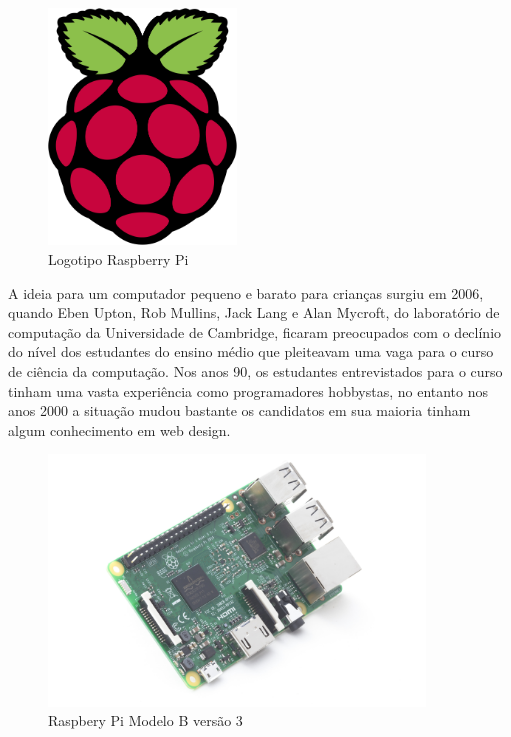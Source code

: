 		 \begin{figure}[h!]
		\caption{\label{fig_raspfound}  Logotipo Raspberry Pi}
		\begin{center}
			\includegraphics[width=50mm]{raspberry-pi-logo.png}	
		\end{center}
	\end{figure}
	A ideia para um computador pequeno e barato para crianças surgiu em 2006, quando Eben Upton, Rob Mullins, Jack Lang e Alan Mycroft, do laboratório de computação da Universidade de Cambridge, ficaram preocupados com o declínio do nível dos estudantes do ensino médio que pleiteavam uma vaga para o curso de ciência da computação. Nos anos 90, os estudantes entrevistados para o curso tinham uma vasta experiência como programadores hobbystas, no entanto nos anos 2000 a situação mudou bastante os candidatos em sua maioria tinham algum conhecimento em web design.\par
	
			 \begin{figure}[h!]
		\caption{\label{fig_raspberry}  Raspbery Pi Modelo B versão 3}
		\begin{center}
			\includegraphics[width=100mm]{rasp3.jpg}	
		\end{center}
	\end{figure}
	
